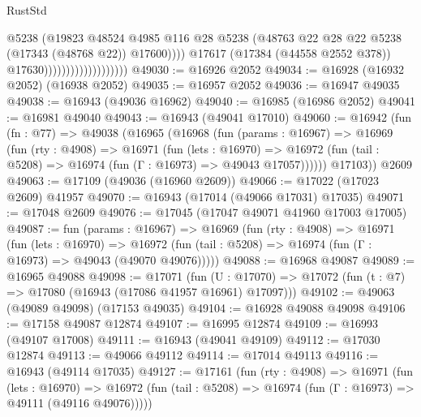 \begin{lexlean}{RustStd}
\begin{coremodule}
                                              @5238
                                              (@19823
                                                @48524
                                                @4985
                                                @116
                                                @28
                                                @5238
                                                (@48763
                                                  @22
                                                  @28
                                                  @22
                                                  @5238
                                                  (@17343 (@48768 @22))
                                                  @17600))))
                                          @17617
                                          (@17384 (@44558 @2552 @378))
                                          @17630)))))))))))))))))))
@49030 := @16926 @2052
@49034 := @16928 (@16932 @2052) (@16938 @2052)
@49035 := @16957 @2052
@49036 := @16947 @49035
@49038 := @16943 (@49036 @16962)
@49040 := @16985 (@16986 @2052)
@49041 := @16981 @49040
@49043 := @16943 (@49041 @17010)
@49060 := @16942
    (fun (fn : @77) =>
    @49038
      (@16965
        (@16968
          (fun (params : @16967) =>
          @16969
            (fun (rty : @4908) =>
            @16971
              (fun (lets : @16970) =>
              @16972 (fun (tail : @5208) => @16974 (fun (Γ : @16973) => @49043 @17057))))))
        @17103))
    @2609
@49063 := @17109 (@49036 (@16960 @2609))
@49066 := @17022 (@17023 @2609) @41957
@49070 := @16943 (@17014 (@49066 @17031) @17035)
@49071 := @17048 @2609
@49076 := @17045 (@17047 @49071 @41960 @17003 @17005)
@49087 := fun (params : @16967) =>
  @16969
    (fun (rty : @4908) =>
    @16971
      (fun (lets : @16970) =>
      @16972 (fun (tail : @5208) => @16974 (fun (Γ : @16973) => @49043 (@49070 @49076)))))
@49088 := @16968 @49087
@49089 := @16965 @49088
@49098 := @17071
    (fun (U : @17070) => @17072 (fun (t : @7) => @17080 (@16943 (@17086 @41957 @16961) @17097)))
@49102 := @49063 (@49089 @49098) (@17153 @49035)
@49104 := @16928 @49088 @49098
@49106 := @17158 @49087 @12874
@49107 := @16995 @12874
@49109 := @16993 (@49107 @17008)
@49111 := @16943 (@49041 @49109)
@49112 := @17030 @12874
@49113 := @49066 @49112
@49114 := @17014 @49113
@49116 := @16943 (@49114 @17035)
@49127 := @17161
    (fun (rty : @4908) =>
    @16971
      (fun (lets : @16970) =>
      @16972 (fun (tail : @5208) => @16974 (fun (Γ : @16973) => @49111 (@49116 @49076)))))

\end{coremodule}
\end{lexlean}
